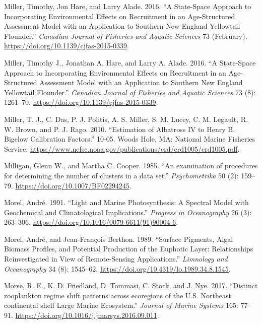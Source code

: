 \documentclass[
]{book}
\begin{document}
\leavevmode\hypertarget{ref-miller2016}{}%
Miller, Timothy, Jon Hare, and Larry Alade. 2016. ``A State-Space Approach to Incorporating Environmental Effects on Recruitment in an Age-Structured Assessment Model with an Application to Southern New England Yellowtail Flounder.'' \emph{Canadian Journal of Fisheries and Aquatic Sciences} 73 (February). \url{https://doi.org/10.1139/cjfas-2015-0339}.

\leavevmode\hypertarget{ref-miller_state-space_2016}{}%
Miller, Timothy J., Jonathan A. Hare, and Larry A. Alade. 2016. ``A State-Space Approach to Incorporating Environmental Effects on Recruitment in an Age-Structured Assessment Model with an Application to Southern New England Yellowtail Flounder.'' \emph{Canadian Journal of Fisheries and Aquatic Sciences} 73 (8): 1261--70. \url{https://doi.org/10.1139/cjfas-2015-0339}.

\leavevmode\hypertarget{ref-Miller_2010}{}%
Miller, T. J., C. Das, P. J. Politis, A. S. Miller, S. M. Lucey, C. M. Legault, R. W. Brown, and P. J. Rago. 2010. ``Estimation of Albatross IV to Henry B. Bigelow Calibration Factors.'' 10-05. Woods Hole, MA: National Marine Fisheries Service. \url{https://www.nefsc.noaa.gov/publications/crd/crd1005/crd1005.pdf}.

\leavevmode\hypertarget{ref-Milligan1985}{}%
Milligan, Glenn W., and Martha C. Cooper. 1985. ``An examination of procedures for determining the number of clusters in a data set.'' \emph{Psychometrika} 50 (2): 159--79. \url{https://doi.org/10.1007/BF02294245}.

\leavevmode\hypertarget{ref-SOE7}{}%
Morel, André. 1991. ``Light and Marine Photosynthesis: A Spectral Model with Geochemical and Climatological Implications.'' \emph{Progress in Oceanography} 26 (3): 263--306. \url{https://doi.org/10.1016/0079-6611(91)90004-6}.

\leavevmode\hypertarget{ref-SOE8}{}%
Morel, André, and Jean-François Berthon. 1989. ``Surface Pigments, Algal Biomass Profiles, and Potential Production of the Euphotic Layer: Relationships Reinvestigated in View of Remote-Sensing Applications.'' \emph{Limnology and Oceanography} 34 (8): 1545--62. \url{https://doi.org/10.4319/lo.1989.34.8.1545}.

\leavevmode\hypertarget{ref-Morse2017}{}%
Morse, R. E., K. D. Friedland, D. Tommasi, C. Stock, and J. Nye. 2017. ``Distinct zooplankton regime shift patterns across ecoregions of the U.S. Northeast continental shelf Large Marine Ecosystem.'' \emph{Journal of Marine Systems} 165: 77--91. \url{https://doi.org/10.1016/j.jmarsys.2016.09.011}.
\end{document}

